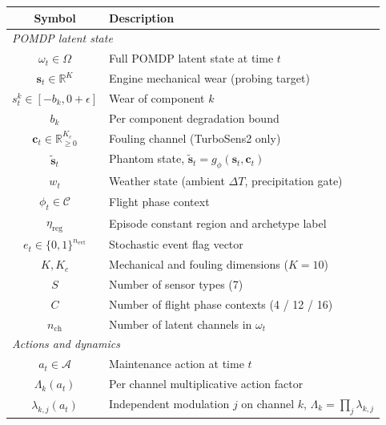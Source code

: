 \begin{table}[h]
\centering
\small
\begin{tabular}{cl}
\toprule
\textbf{Symbol} & \textbf{Description} \\
\midrule
\multicolumn{2}{l}{\textit{POMDP latent state}} \\
$\omega_t \in \Omega$                         & Full POMDP latent state at time $t$ \\
$\mathbf{s}_t \in \mathbb{R}^K$               & Engine mechanical wear (probing target) \\
$s_t^k \in [-b_k, 0+\epsilon]$                & Wear of component $k$ \\
$b_k$                                         & Per component degradation bound \\
$\mathbf{c}_t \in \mathbb{R}_{\ge 0}^{K_c}$   & Fouling channel (TurboSens2 only) \\
$\tilde{\mathbf{s}}_t$                        & Phantom state, $\tilde{\mathbf{s}}_t = g_\phi(\mathbf{s}_t, \mathbf{c}_t)$ \\
$w_t$                                         & Weather state (ambient $\Delta T$, precipitation gate) \\
$\phi_t \in \mathcal{C}$                      & Flight phase context \\
$\eta_\mathrm{reg}$                           & Episode constant region and archetype label \\
$e_t \in \{0,1\}^{n_\mathrm{evt}}$            & Stochastic event flag vector \\
$K, K_c$                                      & Mechanical and fouling dimensions ($K{=}10$) \\
$S$                                           & Number of sensor types (7) \\
$C$                                           & Number of flight phase contexts (4 / 12 / 16) \\
$n_\mathrm{ch}$                               & Number of latent channels in $\omega_t$ \\
\midrule
\multicolumn{2}{l}{\textit{Actions and dynamics}} \\
$a_t \in \mathcal{A}$                         & Maintenance action at time $t$ \\
$\Lambda_k(a_t)$                              & Per channel multiplicative action factor \\
$\lambda_{k,j}(a_t)$                          & Independent modulation $j$ on channel $k$, $\Lambda_k = \prod_j \lambda_{k,j}$ \\

\end{tabular}
\end{table}
